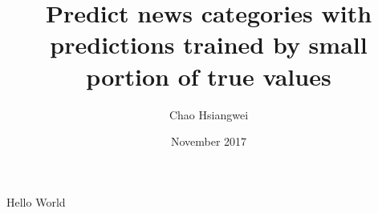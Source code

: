 \documentclass{article}
\title{Predict news categories with predictions trained by small portion of true values}
\author{Chao Hsiangwei}
\date{November 2017}
\begin{document}
	\maketitle
	Hello World
\end{document}
